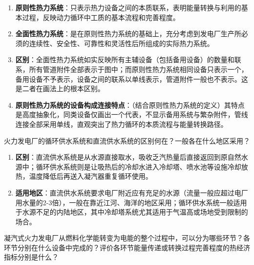 \begin{solution}
\begin{enumerate}
  \item \textbf{原则性热力系统}：只表示热力设备之间的本质联系，表明能量转换与利用的基本过程，反映动力循环中工质的基本流程和完善程度。
  \item \textbf{全面性热力系统}：是在原则性热力系统的基础上，充分考虑到发电厂生产所必须的连续性、安全性、可靠性和灵活性后所组成的实际热力系统。
  \item \textbf{区别}：全面性热力系统如实反映所有主辅设备（包括备用设备）的数量和联系，所有管道附件全部表示于图中；而原则性热力系统相同设备只表示一个，备用设备不予表示，设备之间的联系以单线表示，管道附件一般也不表示。这是二者在画法上的根本区别。
  \item \textbf{原则性热力系统的设备构成连接特点}：（结合原则性热力系统的定义）其特点是高度抽象化，同类设备仅画出一个代表，不显示备用系统与繁杂附件，管线连接全部采用单线，直观突出了热力循环的本质流程与能量转换路径。
\end{enumerate}
\end{solution}

\begin{problem}
火力发电厂的循环供水系统和直流供水系统的区别何在？一般各在什么地区采用？
\end{problem}

\begin{solution}
\begin{enumerate}
  \item \textbf{区别}：直流供水系统是从水源直接取水，吸收乏汽热量后直接返回到原自然水源中；循环供水系统则是让吸热后的冷却水进入冷却塔、喷水池等设施冷却放热，温度降低后再送入凝汽器重复循环使用。
  \item \textbf{适用地区}：直流供水系统要求电厂附近应有充足的水源（流量一般应超过电厂用水量的2-3倍），一般在靠近江河、海洋的地区采用；循环供水系统一般适用于水源不足的内陆地区，其中冷却塔系统尤其适用于气温高或场地受到限制的场合。
\end{enumerate}
\end{solution}

\begin{problem}
凝汽式火力发电厂从燃料化学能转变为电能的整个过程中，可以分为哪些环节？各环节分别在什么设备中完成的？评价各环节能量传递或转换过程完善程度的热经济指标分别是什么？
\end{problem}


